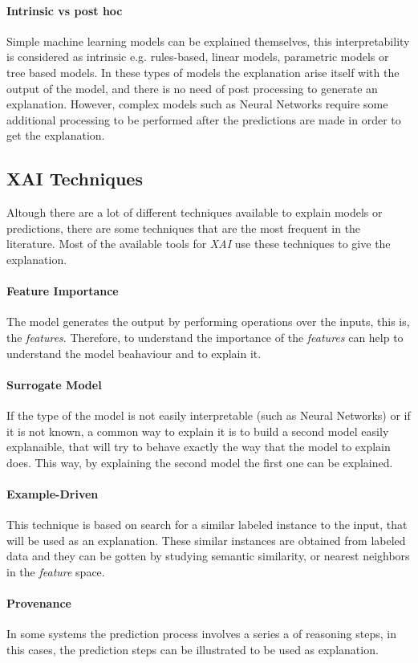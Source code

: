 \paragraph{Intrinsic vs post hoc} Simple machine learning models can be explained themselves, this interpretability is considered as intrinsic e.g. rules-based, linear models, parametric models or tree based models. In these types of models the explanation arise itself with the output of the model, and there is no need of post processing to generate an explanation. However, complex models such as Neural Networks require some additional processing to be performed after the predictions are made in order to get the explanation.
\subsection{XAI Techniques}
\noindent Altough there are a lot of different techniques available to explain models or predictions, there are some techniques that are the most frequent in the literature. Most of the available tools for \emph{XAI} use these techniques to give the explanation.
	\paragraph{Feature Importance} The model generates the output by performing operations over the inputs, this is, the \emph{features}. Therefore, to understand the importance of the \emph{features} can help to understand the model beahaviour and to explain it.
	\paragraph{Surrogate Model} If the type of the model is not easily interpretable (such as Neural Networks) or if it is not known, a common way to explain it is to build a second model easily explanaible, that will try to behave exactly the way that the model to explain does. This way, by explaining the second model the first one can be explained.
	\paragraph{Example-Driven} This technique is based on search for a similar labeled instance to the input, that will be used as an explanation. These similar instances are obtained from labeled data and they can be gotten by studying semantic similarity, or nearest neighbors in the \emph{feature} space.
	\paragraph{Provenance} In some systems the prediction process involves a series a of reasoning steps, in this cases, the prediction steps can be illustrated to be used as explanation.
